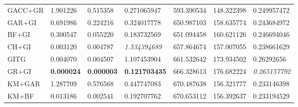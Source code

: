 \begin{table}[H]
\begin{tabular}{lllllll}
        GACC+GR    & 1.901226                                                            & 0.515358                                                              & 0.271065947                                                                        & 593.390534          & 148.322398            & 0.249957472                       \\
        GAR+GI     & 0.691986                                                            & 0.224216                                                              & 0.324017778                                                                        & 650.987103          & 158.635774            & 0.243684972                       \\
        BF+GI      & 0.300547                                                            & 0.055220                                                              & 0.183732569                                                                        & 651.094458          & 160.621126            & 0.246694046                       \\
        CH+GI      & 0.003120                                                            & 0.004787                                                              & \textit{1.534394689}                                                               & 657.864674          & 157.007055            & 0.238661629                       \\
        GITG       & 0.004070                                                            & 0.004507                                                              & 1.107453904                                                                        & 661.532642          & 173.934502            & 0.26292656                        \\
        GR+GI      & \textbf{0.000024}                                                   & \textbf{0.000003}                                                     & \textbf{0.121703435}                                                               & 666.328613          & 176.682224            & \textit{0.265157792}              \\
        KM+GAR     & 1.287709                                                            & 0.576568                                                              & 0.447747083                                                                        & 670.487638          & 156.321777            & 0.233146398                       \\
        KM+BF      & 0.013186                                                            & 0.002541                                                              & 0.192707762                                                                        & 670.653112          & 156.392637            & 0.233194529                       \\

\end{tabular}
\end{table}
